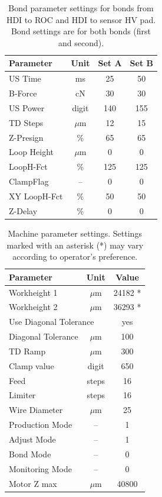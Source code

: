 \documentclass[10pt]{unlsilabsop}
\begin{document}
\begin{table}[hH]
\begin{center}
\caption{Bond parameter settings for bonds from HDI to ROC and HDI to sensor HV pad. Bond settings are for both bonds (first and second).}
\label{tbl:bondpar}

\bigskip

\begin{tabular}{lc|c|c}
\toprule
Parameter & Unit & Set A & Set B  \\
    \midrule
US Time      &  ms    &  25 &  50 \\
B-Force      &  cN    &  30 &  30 \\
US Power     & digit  & 140 & 155 \\
TD Steps     & $\mu$m &  12 &  15 \\
    \midrule
Z-Presign    & \%     &  65 &  65 \\
Loop Height  & $\mu$m &   0 &   0 \\
LoopH-Fct    & \%     & 125 & 125 \\
ClampFlag    & --     &   0 &   0 \\
XY LoopH-Fct & \%     &  50 &  50 \\
Z-Delay      & \%     &   0 &   0 \\
   \bottomrule
\end{tabular}
\end{center}
\end{table}

\begin{table}[hH]
\begin{center}
\caption{Machine parameter settings. Settings marked with an asterisk (*) may vary according to operator's preference.}
\label{tbl:otherpar}

\bigskip

\begin{tabular}{lcc}
\toprule
Parameter          & Unit   & Value \\
\midrule
Workheight 1       & $\mu$m & 24182 *\\
Workheight 2       & $\mu$m & 36293 * \\
\multicolumn{2}{l}{Use Diagonal Tolerance} & yes \\
Diagonal Tolerance & $\mu$m & 100 \\
TD Ramp            & $\mu$m & 300 \\
Clamp value        & digit  & 650 \\
Feed               & steps  & 16 \\
Limiter            & steps  & 16 \\
Wire Diameter      & $\mu$m & 25 \\
Production Mode    & --     & 1 \\
Adjust Mode        & --     & 1 \\
Bond Mode          & --     & 0 \\
Monitoring Mode    & --     & 0 \\
\midrule
Motor Z max        & $\mu$m & 40800 \\
    \bottomrule
\end{tabular}
\end{center}
\end{table}
\end{document}
